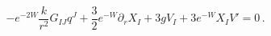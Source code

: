 \begin{equation}
- e^{-2W} \frac{k}{r^2}G_{IJ} q^J + \frac 32 e^{-W} \partial_r X_I + 3g V_I
+ 3 e^{-W} X_I V' = 0\,. \label{flowequ}
\end{equation}

